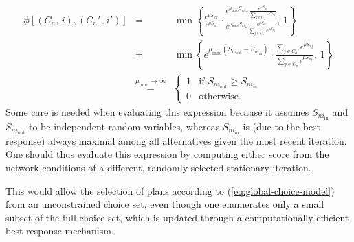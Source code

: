 \begin{eqnarray}
\phi[(C_{n},\, i),(C_{n}',\, i')] & = & 
\min\left\{ 
\frac{e^{\mu S_{ni'}}}{e^{\mu S_{ni}}}\cdot
\frac{{\displaystyle e^{\mu_{\text{inno}}S_{ni_{\text{out}}}}\frac{\displaystyle e^{\mu S_{ni}}}{\sum_{j\in C_{n}}\displaystyle e^{\mu S_{nj}}}}}
{{\displaystyle e^{\mu_{\text{inno}}S_{ni_{\text{in}}}}\frac{\displaystyle e^{\mu S_{ni'}}}{\sum_{j\in C_{n}'} \displaystyle e^{\mu S_{nj}}}}},\,1\right\} \\
 & = & 
 \min\left\{ 
 {\displaystyle e^{\mu_{\text{inno}}(S_{ni_{\text{out}}}-S_{ni_{\text{in}}})}} \cdot
 \frac{\sum_{j\in C_{n}'} \displaystyle e^{\mu S_{nj}}}{\sum_{j\in C_{n}} \displaystyle e^{\mu S_{nj}}},\,1\right\} \\[.5em]
\label{eq:limiting-accept-proba}
& \stackrel{\mu_{\text{inno}}\rightarrow\infty}{=} & 
\begin{cases}
1 & \text{if } S_{ni_{\text{out}}}\geq S_{ni_{\text{in}}} \\
0 & \text{otherwise.}
\end{cases}
\end{eqnarray}
Some care is needed when evaluating this expression because it assumes
$S_{ni_{\text{in}}}$ and $S_{ni_{\text{out}}}$ to be independent
random variables, whereas $S_{ni_{\text{in}}}$ is (due to the best
response) always maximal among all alternatives\corr{,}{} given the most recent
iteration. One should thus evaluate this expression by computing
either score from the network conditions of
%
%
a different, randomly selected stationary iteration.
%



This would allow the selection of plans according to
(\ref{eq:global-choice-model}) from an unconstrained choice set, even though one
enumerates only a small subset of the full choice set, which is updated through
a computationally efficient best-response mechanism.

